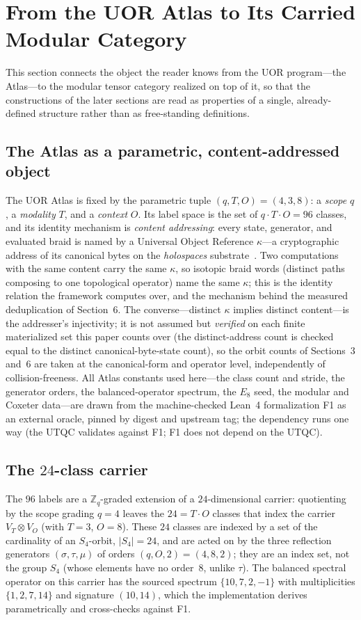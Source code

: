 \section{From the UOR Atlas to Its Carried Modular Category}
\label{sec:bridge}

This section connects the object the reader knows from the UOR program---the Atlas---to the modular tensor category realized on top of it, so that the constructions of the later sections are read as properties of a single, already-defined structure rather than as free-standing definitions.

\subsection{The Atlas as a parametric, content-addressed object}
The UOR Atlas is fixed by the parametric tuple $(q, T, O) = (4, 3, 8)$: a \emph{scope} $q$, a \emph{modality} $T$, and a \emph{context} $O$. Its label space is the set of $q\cdot T\cdot O = 96$ classes, and its identity mechanism is \emph{content addressing}: every state, generator, and evaluated braid is named by a Universal Object Reference $\kappa$---a cryptographic address of its canonical bytes on the \textit{holospaces} substrate~\cite{holospaces}. Two computations with the same content carry the same $\kappa$, so isotopic braid words (distinct paths composing to one topological operator) name the same $\kappa$; this is the identity relation the framework computes over, and the mechanism behind the measured deduplication of Section~6. The converse---distinct $\kappa$ implies distinct content---is the addresser's injectivity; it is not assumed but \emph{verified} on each finite materialized set this paper counts over (the distinct-address count is checked equal to the distinct canonical-byte-state count), so the orbit counts of Sections~3 and~6 are taken at the canonical-form and operator level, independently of collision-freeness. All Atlas constants used here---the class count and stride, the generator orders, the balanced-operator spectrum, the $E_8$ seed, the modular and Coxeter data---are drawn from the machine-checked Lean~4 formalization F1 as an external oracle, pinned by digest and upstream tag; the dependency runs one way (the UTQC validates against F1; F1 does not depend on the UTQC).

\subsection{The $24$-class carrier}
The $96$ labels are a $\mathbb{Z}_q$-graded extension of a $24$-dimensional carrier: quotienting by the scope grading $q = 4$ leaves the $24 = T\cdot O$ classes that index the carrier $V_T \otimes V_O$ (with $T = 3$, $O = 8$). These $24$ classes are indexed by a set of the cardinality of an $S_4$-orbit, $|S_4| = 24$, and are acted on by the three reflection generators $(\sigma, \tau, \mu)$ of orders $(q, O, 2) = (4, 8, 2)$; they are an index set, not the group $S_4$ (whose elements have no order~$8$, unlike $\tau$). The balanced spectral operator on this carrier has the sourced spectrum $\{10, 7, 2, -1\}$ with multiplicities $\{1, 2, 7, 14\}$ and signature $(10, 14)$, which the implementation derives parametrically and cross-checks against F1.

